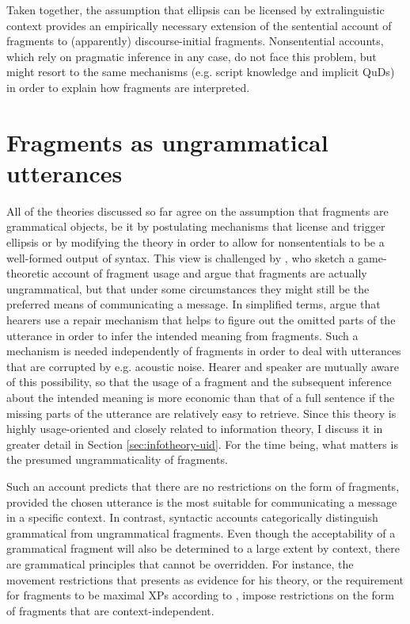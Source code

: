 Taken together, the assumption that ellipsis can be licensed by extralinguistic context provides an empirically necessary extension of the sentential account of fragments to (apparently) discourse-initial fragments. Nonsentential accounts, which rely on pragmatic inference in any case, do not face this problem, but might resort to the same mechanisms (e.g. script knowledge and implicit QuDs) in order to explain how fragments are interpreted.


\section{Fragments as ungrammatical utterances}  \label{sec:theories-ungrammatical}

All of the theories discussed so far agree on the assumption that fragments are grammatical objects, be it by postulating mechanisms that license and trigger ellipsis or by modifying the theory in order to allow for nonsententials to be a well-formed output of syntax. This view is challenged by \citet{bergen.goodman2015}, who sketch a game-theoretic account of fragment usage and argue that fragments are actually ungrammatical, but that under some circumstances they might still be the preferred means of communicating a message. In simplified terms, \citeauthor{bergen.goodman2015} argue that hearers use a repair mechanism that helps to figure out the omitted parts of the utterance in order to infer the intended meaning from fragments. Such a mechanism is needed independently of fragments in order to deal with utterances that are corrupted by e.g. acoustic noise. Hearer and speaker are mutually aware of this possibility, so that the usage of a fragment and the subsequent inference about the intended meaning is more economic than that of a full sentence if the missing parts of the utterance are relatively easy to retrieve. Since this theory is highly usage-oriented and closely related to information theory, I discuss it in greater detail in Section \ref{sec:infotheory-uid}. For the time being, what matters is the presumed ungrammaticality of fragments.

Such an account predicts that there are no restrictions on the form of fragments, provided the chosen utterance is the most suitable for communicating a message in a specific context. In contrast, syntactic accounts categorically distinguish grammatical from ungrammatical fragments. Even though the acceptability of a grammatical fragment will also be determined to a large extent by context, there are grammatical principles that cannot be overridden. For instance, the movement restrictions that \citet{merchant2004} presents as evidence for his theory, or the requirement for fragments to be maximal XPs according to \citet{barton.progovac2005}, impose restrictions on the form of fragments that are context-independent.

